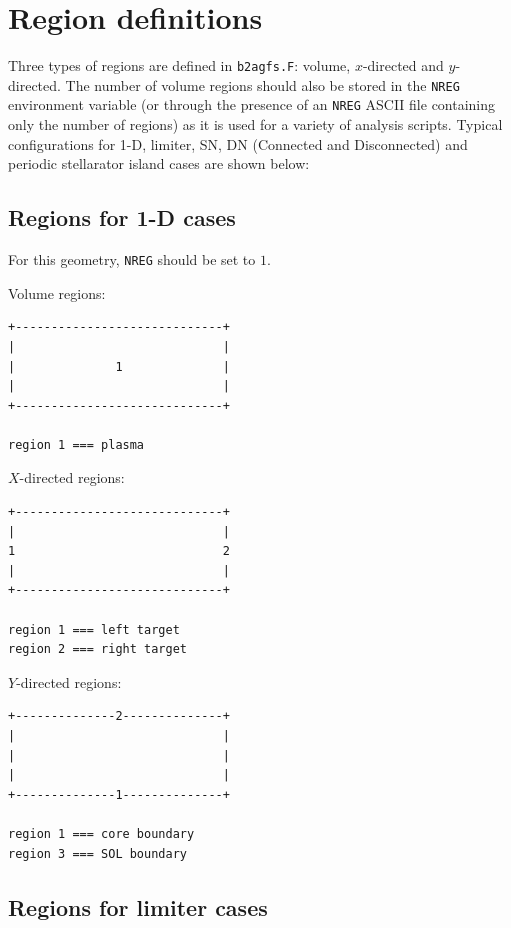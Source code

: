 \documentclass[a4paper,10pt]{report}
\begin{document}
\clearpage

\chapter{Region definitions}
\label{cha:regions}

Three types of regions are defined in {\tt b2agfs.F}: volume,
$x$-directed and $y$-directed.  The number of volume regions should also
be stored in the {\tt NREG} environment variable (or through the presence
of an {\tt NREG} ASCII file containing only the number of regions) as it is
used for a variety of analysis scripts.
Typical configurations for 1-D, limiter,
SN, DN (Connected and Disconnected) and periodic stellarator island cases are
shown below:

\clearpage
\section{Regions for 1-D cases}

For this geometry, {\tt NREG} should be set to $1$.

Volume regions:
\begin{verbatim}
+-----------------------------+
|                             |
|              1              |
|                             |
+-----------------------------+

region 1 === plasma
\end{verbatim}

$X$-directed regions:
\begin{verbatim}
+-----------------------------+
|                             |
1                             2
|                             |
+-----------------------------+

region 1 === left target
region 2 === right target
\end{verbatim}

$Y$-directed regions:
\begin{verbatim}
+--------------2--------------+
|                             |
|                             |
|                             |
+--------------1--------------+

region 1 === core boundary
region 3 === SOL boundary
\end{verbatim}

\clearpage
\section{Regions for limiter cases}
\end{document}
